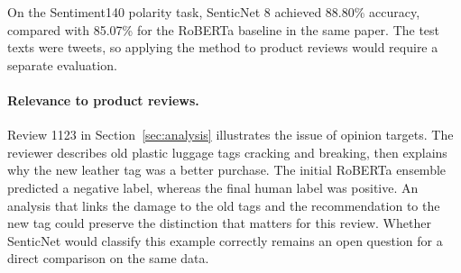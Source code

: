 On the Sentiment140 polarity task, SenticNet 8 achieved 88.80\%
accuracy, compared with 85.07\% for the RoBERTa baseline in the same
paper. The test texts were tweets, so applying the method to product
reviews would require a separate evaluation.

\paragraph{Relevance to product reviews.}
Review 1123 in Section~\ref{sec:analysis} illustrates the issue of opinion targets.
The reviewer describes old plastic luggage tags cracking and
breaking, then explains why the new leather tag was a better
purchase. The initial RoBERTa ensemble predicted a negative label,
whereas the final human label was positive. An analysis that links the damage to the
old tags and the recommendation to the new tag could preserve the
distinction that matters for this review. Whether SenticNet would
classify this example correctly remains an open question for a
direct comparison on the same data.
